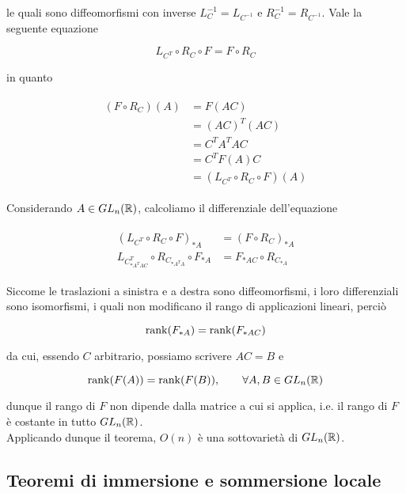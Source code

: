 le quali sono diffeomorfismi con inverse $ L_{C}^{-1} = L_{C^{-1}} $ e $ R_{C}^{-1} = R_{C^{-1}} $. Vale la seguente equazione

\begin{equation}
	L_{C^{T}} \circ R_{C} \circ F = F \circ R_{C}
\end{equation}

in quanto

\begin{align}
	\begin{split}
		(F \circ R_{C})(A) &= F(AC)\\
		&= (AC)^{T} (AC)\\
		&= C^{T} A^{T} A C\\
		&= C^{T} F(A) C\\
		&= (L_{C^{T}} \circ R_{C} \circ F)(A)
	\end{split}
\end{align}

Considerando $ A \in GL_{n}(\mathbb{R}) $, calcoliamo il differenziale dell'equazione

\begin{align}
	\begin{split}
		(L_{C^{T}} \circ R_{C} \circ F)_{*A} &= (F \circ R_{C})_{*A}\\
		L_{C^{T}_{*A^{T} A C}} \circ R_{C_{*A^{T} A}} \circ F_{*A} &= F_{*A C} \circ R_{C_{*A}}
	\end{split}
\end{align}

Siccome le traslazioni a sinistra e a destra sono diffeomorfismi, i loro differenziali sono isomorfismi, i quali non modificano il rango di applicazioni lineari, perciò

\begin{equation}
	\rank(F_{*A}) = \rank(F_{*A C})
\end{equation}

da cui, essendo $ C $ arbitrario, possiamo scrivere $ A C = B $ e

\begin{equation}
	\rank(F(A)) = \rank(F(B)), \qquad \forall A,B \in GL_{n}(\mathbb{R})
\end{equation}

dunque il rango di $ F $ non dipende dalla matrice a cui si applica, i.e. il rango di $ F $ è costante in tutto $ GL_{n}(\mathbb{R}) $.\\
Applicando dunque il teorema, $ O(n) $ è una sottovarietà di $ GL_{n}(\mathbb{R}) $.

\subsection{Teoremi di immersione e sommersione locale}

